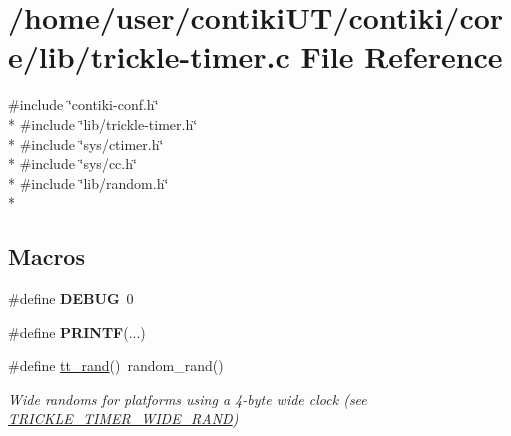\hypertarget{trickle-timer_8c}{}\section{/home/user/contiki\+U\+T/contiki/core/lib/trickle-\/timer.c File Reference}
\label{trickle-timer_8c}
{\ttfamily \#include \char`\"{}contiki-\/conf.\+h\char`\"{}}\\*
{\ttfamily \#include \char`\"{}lib/trickle-\/timer.\+h\char`\"{}}\\*
{\ttfamily \#include \char`\"{}sys/ctimer.\+h\char`\"{}}\\*
{\ttfamily \#include \char`\"{}sys/cc.\+h\char`\"{}}\\*
{\ttfamily \#include \char`\"{}lib/random.\+h\char`\"{}}\\*
\subsection*{Macros}
\begin{DoxyCompactItemize}
\item 
\hypertarget{group__trickle-timer_gad72dbcf6d0153db1b8d8a58001feed83}{}\#define {\bfseries D\+E\+B\+U\+G}~0\label{group__trickle-timer_gad72dbcf6d0153db1b8d8a58001feed83}

\item 
\hypertarget{group__trickle-timer_ga1f464e950a4fa11e8821b5c725921a15}{}\#define {\bfseries P\+R\+I\+N\+T\+F}(...)\label{group__trickle-timer_ga1f464e950a4fa11e8821b5c725921a15}

\item 
\hypertarget{group__trickle-timer_gaf612a348c64f66b8d578b190dc7e87ed}{}\#define \hyperlink{group__trickle-timer_gaf612a348c64f66b8d578b190dc7e87ed}{tt\+\_\+rand}()~random\+\_\+rand()\label{group__trickle-timer_gaf612a348c64f66b8d578b190dc7e87ed}

\begin{DoxyCompactList}\small\item\em Wide randoms for platforms using a 4-\/byte wide clock (see \hyperlink{group__trickle-timer_ga2b3b9fd1a895243db18b35b7600bac15}{T\+R\+I\+C\+K\+L\+E\+\_\+\+T\+I\+M\+E\+R\+\_\+\+W\+I\+D\+E\+\_\+\+R\+A\+N\+D}) \end{DoxyCompactList}\end{DoxyCompactItemize}
